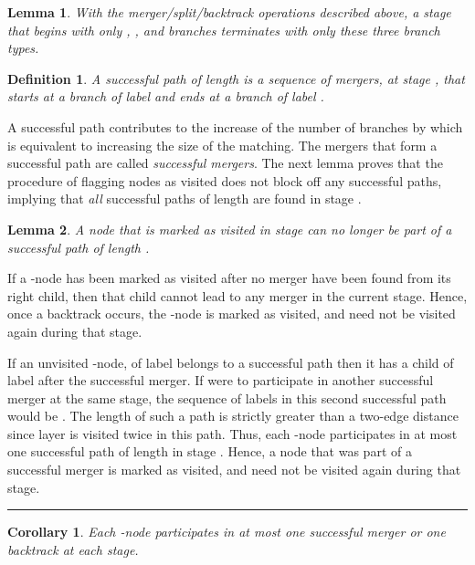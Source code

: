 \documentclass{article}
\newtheorem{lemma}{Lemma}[section]
\newtheorem{corollary}{Corollary}[section]
\newtheorem{definition}{Definition}[section]
\newenvironment{proof}[1][Proof:]{\begin{trivlist}
\item[\hskip \labelsep {\bfseries #1}]}{\end{trivlist}}
\newcommand{\qed}{\hfill \rule{2.5mm}{2.5mm}}
\begin{document}
\begin{lemma}
\label{property:threeTypes}
With the merger/split/backtrack operations described above, a stage that begins with only , , and  branches terminates with only these three branch types.
\end{lemma}

\begin{definition}
A {\em successful} path of length  is a sequence of mergers, at stage , that starts at a  branch of label  and ends at a  branch of label .
\end{definition}

A successful path  contributes to the increase of the number of  branches by  which is equivalent to increasing the size of the matching. The mergers that form a successful path are called {\em successful mergers}. The next lemma proves that the procedure of flagging nodes as visited does not block off any successful paths, implying that {\em all} successful paths of length  are found in stage .

\begin{lemma}
\label{lem:visited} A node that is marked as visited in stage  can no longer be part of a successful path of length .
\end{lemma}
\begin{proof}
If a -node has been marked as visited after no merger have been found from its right child, then that child cannot lead to any merger in the current stage.  Hence, once a backtrack occurs, the -node is marked as visited, and need not be visited again during that stage.

If an unvisited -node,  of label  belongs to a successful path then it has a child of label  after the successful merger. If  were to participate in another successful merger at the same stage, the sequence of labels in this second successful path would be . The length of such a path is strictly greater than a two-edge distance  since layer  is visited twice in this path. Thus, each -node participates in at most one successful path of length  in stage . Hence, a node that was part of a successful merger is marked as visited, and need not be visited again during that stage. \qed
\end{proof}

\begin{corollary}
\label{cor:nodethroughput}
Each -node participates in at most one successful merger or one backtrack at each stage.
\end{corollary}
\end{document}

